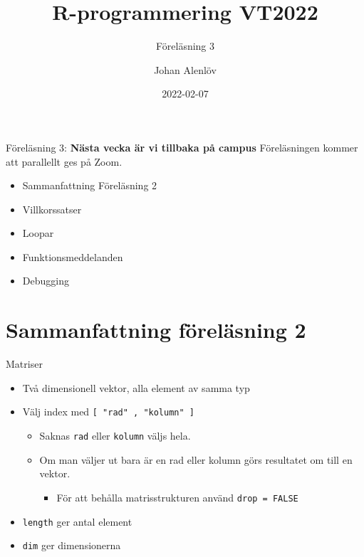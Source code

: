 \documentclass[
  11pt,
  ignorenonframetext,
]{beamer}
\title{R-programmering VT2022}
\subtitle{Föreläsning 3}
\author{Johan Alenlöv}
\date{2022-02-07}
\institute{Linköpings Universitet}
\providecommand{\tightlist}{%
  \setlength{\itemsep}{0pt}\setlength{\parskip}{0pt}}
\begin{document}
\frame{\titlepage}

\begin{frame}{Föreläsning 3:}
\protect\hypertarget{fuxf6reluxe4sning-3}{}
\textbf{Nästa vecka är vi tillbaka på campus} Föreläsningen kommer att
parallellt ges på Zoom.

\begin{itemize}
\tightlist
\item
  Sammanfattning Föreläsning 2
\item
  Villkorssatser
\item
  Loopar
\item
  Funktionsmeddelanden
\item
  Debugging
\end{itemize}
\end{frame}

\hypertarget{sammanfattning-fuxf6reluxe4sning-2}{%
\section{Sammanfattning föreläsning
2}\label{sammanfattning-fuxf6reluxe4sning-2}}

\begin{frame}{Matriser}
\protect\hypertarget{matriser}{}
\begin{itemize}
\tightlist
\item
  Två dimensionell vektor, alla element av samma typ
\item
  Välj index med \texttt{[ "rad" , "kolumn" ]}

  \begin{itemize}
  \tightlist
  \item
    Saknas \texttt{rad} eller \texttt{kolumn} väljs hela.
  \item
    Om man väljer ut bara är en rad eller kolumn görs resultatet om till
    en vektor.

    \begin{itemize}
    \tightlist
    \item
      För att behålla matrisstrukturen använd \texttt{drop = FALSE}
    \end{itemize}
  \end{itemize}
\item
  \texttt{length} ger antal element
\item
  \texttt{dim} ger dimensionerna
\end{itemize}
\end{frame}
\end{document}
